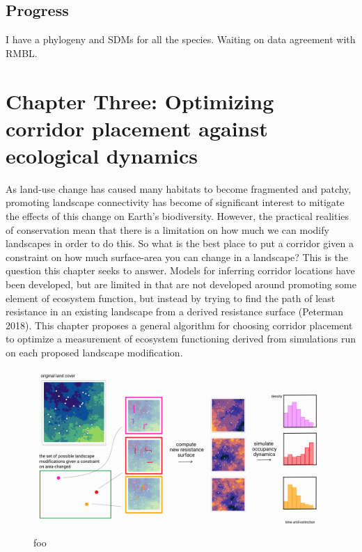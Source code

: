 \documentclass[11pt]{article}
\makeatletter
\def\maxwidth{\ifdim\Gin@nat@width>\linewidth\linewidth
\else\Gin@nat@width\fi}
\let\Oldincludegraphics\includegraphics
\renewcommand{\includegraphics}[1]{\Oldincludegraphics[width=\maxwidth]{#1}}
\makeatother
\begin{document}
\hypertarget{progress-1}{%
\subsection{Progress}\label{progress-1}}

I have a phylogeny and SDMs for all the species. Waiting on data
agreement with RMBL.

\hypertarget{chapter-three-optimizing-corridor-placement-against-ecological-dynamics}{%
\section{Chapter Three: Optimizing corridor placement against ecological
dynamics}\label{chapter-three-optimizing-corridor-placement-against-ecological-dynamics}}

As land-use change has caused many habitats to become fragmented and
patchy, promoting landscape connectivity has become of significant
interest to mitigate the effects of this change on Earth's biodiversity.
However, the practical realities of conservation mean that there is a
limitation on how much we can modify landscapes in order to do this. So
what is the best place to put a corridor given a constraint on how much
surface-area you can change in a landscape? This is the question this
chapter seeks to answer. Models for inferring corridor locations have
been developed, but are limited in that are not developed around
promoting some element of ecosystem function, but instead by trying to
find the path of least resistance in an existing landscape from a
derived resistance surface (Peterman 2018). This chapter proposes a
general algorithm for choosing corridor placement to optimize a
measurement of ecosystem functioning derived from simulations run on
each proposed landscape modification.

\begin{figure}
\hypertarget{fig:ch3}{%
\centering
\includegraphics{./figures/ch3.png}
\caption{foo}\label{fig:ch3}
}
\end{figure}
\end{document}
